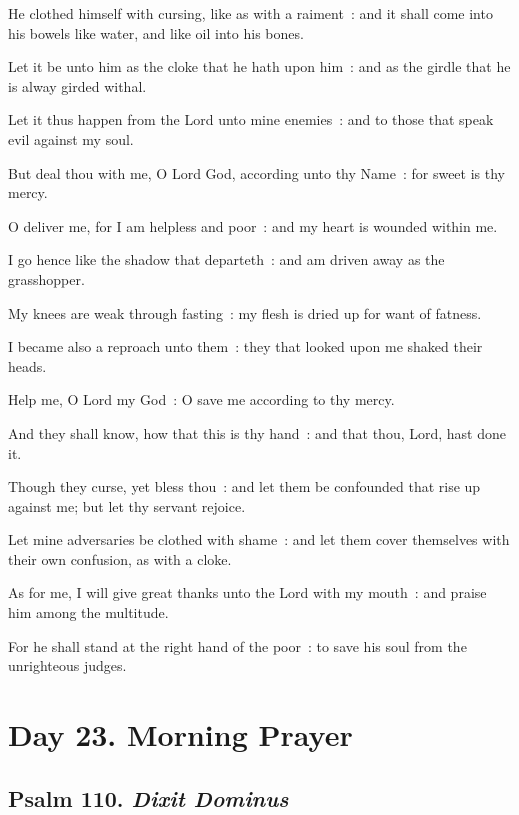 He clothed himself with cursing, like as with a raiment~: and it shall come into his bowels like water, and like oil into his bones.\par
{}Let it be unto him as the cloke that he hath upon him~: and as the girdle that he is alway girded withal.\par
{}Let it thus happen from the Lord unto mine enemies~: and to those that speak evil against my soul.\par
{}But deal thou with me, O Lord God, according unto thy Name~: for sweet is thy mercy.\par
{}O deliver me, for I am helpless and poor~: and my heart is wounded within me.\par
{}I go hence like the shadow that departeth~: and am driven away as the grasshopper.\par
{}My knees are weak through fasting~: my flesh is dried up for want of fatness.\par
{}I became also a reproach unto them~: they that looked upon me shaked their heads.\par
{}Help me, O Lord my God~: O save me according to thy mercy.\par
{}And they shall know, how that this is thy hand~: and that thou, Lord, hast done it.\par
{}Though they curse, yet bless thou~: and let them be confounded that rise up against me; but let thy servant rejoice.\par
{}Let mine adversaries be clothed with shame~: and let them cover themselves with their own confusion, as with a cloke.\par
{}As for me, I will give great thanks unto the Lord with my mouth~: and praise him among the multitude.\par
{}For he shall stand at the right hand of the poor~: to save his soul from the unrighteous judges.\par

\section*{Day 23. Morning Prayer}

\subsection{Psalm 110. \textit{Dixit Dominus}}

